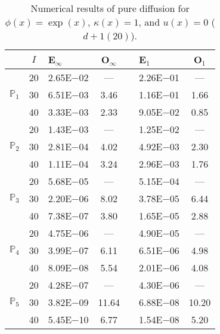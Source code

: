 \begin{table}[H]
\centering
\caption{Numerical results of pure diffusion for $\phi(x)=\exp(x)$, $\kappa(x)=1$, and $u(x)=0$ ($d+1 (20)$).}
\begin{tabular}{@{}l c l c c l c@{}}
\toprule
 & $I$ & E$_{\infty}$ & O$_{\infty}$ && E$_1$ & O$_1$\\
\midrule
\multirow{3}{*}{$\mathbb{P}_{1}$}
 & 20 & 2.65E$-$02 & --- && 2.26E$-$01 & ---\\
 & 30 & 6.51E$-$03 & 3.46 && 1.16E$-$01 & 1.66\\
 & 40 & 3.33E$-$03 & 2.33 && 9.05E$-$02 & 0.85\\
\midrule
\multirow{3}{*}{$\mathbb{P}_{2}$}
 & 20 & 1.43E$-$03 & --- && 1.25E$-$02 & ---\\
 & 30 & 2.81E$-$04 & 4.02 && 4.92E$-$03 & 2.30\\
 & 40 & 1.11E$-$04 & 3.24 && 2.96E$-$03 & 1.76\\
\midrule
\multirow{3}{*}{$\mathbb{P}_{3}$}
 & 20 & 5.68E$-$05 & --- && 5.15E$-$04 & ---\\
 & 30 & 2.20E$-$06 & 8.02 && 3.78E$-$05 & 6.44\\
 & 40 & 7.38E$-$07 & 3.80 && 1.65E$-$05 & 2.88\\
\midrule
\multirow{3}{*}{$\mathbb{P}_{4}$}
 & 20 & 4.75E$-$06 & --- && 4.90E$-$05 & ---\\
 & 30 & 3.99E$-$07 & 6.11 && 6.51E$-$06 & 4.98\\
 & 40 & 8.09E$-$08 & 5.54 && 2.01E$-$06 & 4.08\\
\midrule
\multirow{3}{*}{$\mathbb{P}_{5}$}
 & 20 & 4.28E$-$07 & --- && 4.30E$-$06 & ---\\
 & 30 & 3.82E$-$09 & 11.64 && 6.88E$-$08 & 10.20\\
 & 40 & 5.45E$-$10 & 6.77 && 1.54E$-$08 & 5.20\\
\bottomrule
\end{tabular}
\end{table}